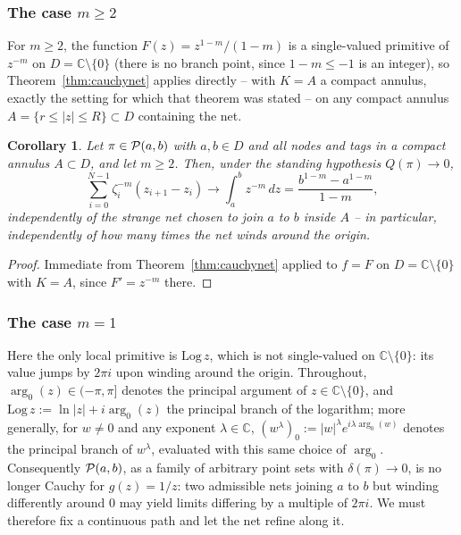 \documentclass[11pt,fleqn]{article}
\def\C{\mathbb C}
\theoremstyle{plain}
\newtheorem{cor}[thm]{Corollary}
\theoremstyle{remark}
\begin{document}
\subsubsection{The case $m\ge2$}

For $m\ge2$, the function $F(z)=z^{1-m}/(1-m)$ is a single-valued
primitive of $z^{-m}$ on $D=\C\setminus\{0\}$ (there is no branch point,
since $1-m\le-1$ is an integer), so Theorem~\ref{thm:cauchynet} applies
directly -- with $K=A$ a compact annulus, exactly the setting for which
that theorem was stated -- on any compact annulus $A=\{r\le|z|\le R\}\subset D$
containing the net.

\begin{cor}\label{cor:negpower}
Let $\pi\in{\cal P}(a,b)$ with $a,b\in D$ and all nodes and tags in a
compact annulus $A\subset D$, and let $m\ge2$. Then, under the standing
hypothesis $Q(\pi)\to0$,
\[
\sum_{i=0}^{N-1}\zeta_i^{-m}(z_{i+1}-z_i)\longrightarrow
\int_a^bz^{-m}\,dz=\frac{b^{1-m}-a^{1-m}}{1-m},
\]
independently of the strange net chosen to join $a$ to $b$ inside $A$ --
in particular, independently of how many times the net winds around the
origin.
\end{cor}
\begin{proof}
Immediate from Theorem~\ref{thm:cauchynet} applied to $f=F$ on $D=\C\setminus\{0\}$
with $K=A$, since $F'=z^{-m}$ there.
\end{proof}

\subsubsection{The case $m=1$}\label{sec:argument-m1}

Here the only local primitive is $\mathrm{Log}\,z$, which is not
single-valued on $\C\setminus\{0\}$: its value jumps by $2\pi i$ upon
winding around the origin. Throughout, $\arg_0(z)\in(-\pi,\pi]$ denotes
the principal argument of $z\in\C\setminus\{0\}$, and
$\mathrm{Log}\,z:=\ln|z|+i\arg_0(z)$ the principal branch of the
logarithm; more generally, for $w\ne0$ and any exponent $\lambda\in\C$,
$(w^\lambda)_0:=|w|^\lambda e^{i\lambda\arg_0(w)}$ denotes the principal
branch of $w^\lambda$, evaluated with this same choice of $\arg_0$.
Consequently ${\cal P}(a,b)$, as a family of
arbitrary point sets with $\delta(\pi)\to0$, is no longer Cauchy for
$g(z)=1/z$: two admissible nets joining $a$ to $b$ but winding differently
around $0$ may yield limits differing by a multiple of $2\pi i$. We must
therefore fix a continuous path and let the net refine along it.
\end{document}
